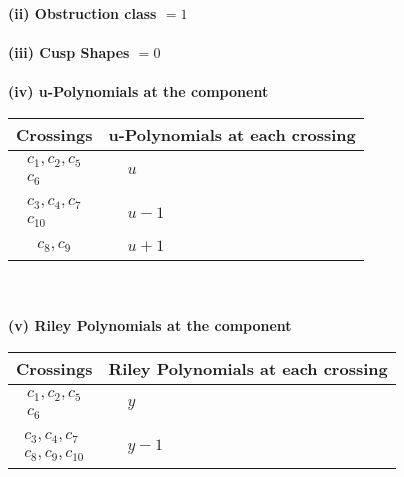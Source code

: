 \documentclass[1p]{elsarticle_modified}
\theoremstyle{definition}
\begin{document}
\flushleft \textbf{(ii) Obstruction class $= 1$}\\~\\
\flushleft \textbf{(iii) Cusp Shapes $= 0$}\\~\\
\newpage\renewcommand{\arraystretch}{1}
\flushleft \textbf{(iv) u-Polynomials at the component}\newline \\
\begin{tabular}{m{50pt}|m{274pt}}
Crossings & \hspace{64pt}u-Polynomials at each crossing \\
\hline $$\begin{aligned}c_{1},c_{2},c_{5}\\c_{6}\end{aligned}$$&$\begin{aligned}
&u
\end{aligned}$\\
\hline $$\begin{aligned}c_{3},c_{4},c_{7}\\c_{10}\end{aligned}$$&$\begin{aligned}
&u-1
\end{aligned}$\\
\hline $$\begin{aligned}c_{8},c_{9}\end{aligned}$$&$\begin{aligned}
&u+1
\end{aligned}$\\
\hline
\end{tabular}\\~\\
\newpage\renewcommand{\arraystretch}{1}
\flushleft \textbf{(v) Riley Polynomials at the component}\newline \\
\begin{tabular}{m{50pt}|m{274pt}}
Crossings & \hspace{64pt}Riley Polynomials at each crossing \\
\hline $$\begin{aligned}c_{1},c_{2},c_{5}\\c_{6}\end{aligned}$$&$\begin{aligned}
&y
\end{aligned}$\\
\hline $$\begin{aligned}c_{3},c_{4},c_{7}\\c_{8},c_{9},c_{10}\end{aligned}$$&$\begin{aligned}
&y-1
\end{aligned}$\\
\hline
\end{tabular}\\~\\
\end{document}
